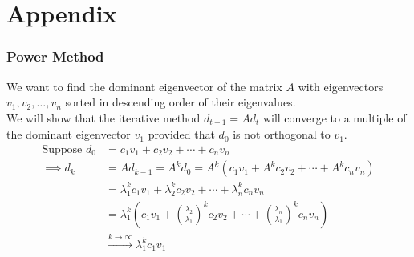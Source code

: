 \section{Appendix}
\label{sec:appendix}

\begin{frame}
    \frametitle{Power Method}

We want to find the dominant eigenvector of the matrix \(A\) with eigenvectors \(v_1, v_2, \ldots, v_n\) sorted in descending order of their eigenvalues.\\
We will show that the iterative method \(d_{t+1} = A d_t
\) will converge to a multiple of the dominant eigenvector \(v_1\) provided that \(d_0\) is not orthogonal to \(v_1\).\\
\begin{align*}
\text{Suppose } d_0 &= c_1 v_1 + c_2 v_2 + \cdots + c_n v_n\\
\implies d_k &= Ad_{k-1} = A^k d_0 = A^k (c_1 v_1 + A^k c_2 v_2 + \cdots + A^k c_n v_n)\\
&= \lambda_1^k c_1 v_1 + \lambda_2^k c_2 v_2 + \cdots + \lambda_n^k c_n v_n\\
&= \lambda_1^k (c_1 v_1 + \left(\frac{\lambda_2}{\lambda_1}\right)^k c_2 v_2 + \cdots + \left(\frac{\lambda_n}{\lambda_1}\right)^k c_n v_n)\\
&\xrightarrow[]{k \to \infty} \lambda_1^k c_1 v_1
\end{align*}
\end{frame}